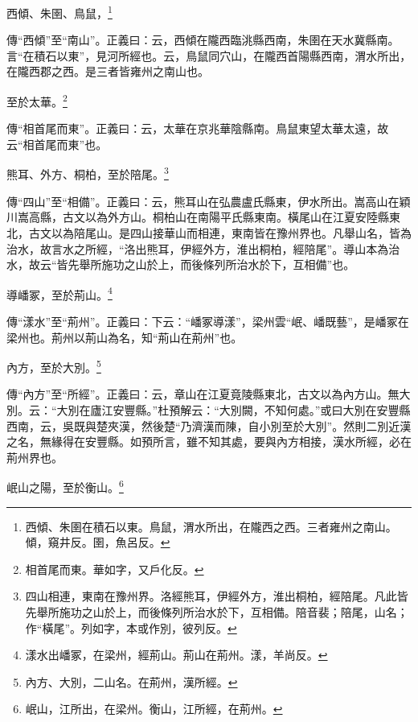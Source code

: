西傾、朱圉、鳥鼠，\footnote{西傾、朱圉在積石以東。鳥鼠，渭水所出，在隴西之西。三者雍州之南山。傾，窺井反。圉，魚呂反。}

{\noindent\zhuan{}\fzbyks 傳“西傾”至“南山”。正義曰：云，西傾在隴西臨洮縣西南，朱圉在天水冀縣南。言“在積石以東”，見河所經也。云，鳥鼠同穴山，在隴西首陽縣西南，渭水所出，在隴西郡之西。是三者皆雍州之南山也。 \par}

至於太華。\footnote{相首尾而東。華如字，又戶化反。}

{\noindent\zhuan{}\fzbyks 傳“相首尾而東”。正義曰：云，太華在京兆華陰縣南。鳥鼠東望太華太遠，故云“相首尾而東”也。 \par}

熊耳、外方、桐柏，至於陪尾。\footnote{四山相連，東南在豫州界。洛經熊耳，伊經外方，淮出桐柏，經陪尾。凡此皆先舉所施功之山於上，而後條列所治水於下，互相備。陪音裴；陪尾，山名；作“橫尾”。列如字，本或作別，彼列反。}

{\noindent\zhuan{}\fzbyks 傳“四山”至“相備”。正義曰：云，熊耳山在弘農盧氏縣東，伊水所出。嵩高山在穎川嵩高縣，古文以為外方山。桐柏山在南陽平氏縣東南。橫尾山在江夏安陸縣東北，古文以為陪尾山。是四山接華山而相連，東南皆在豫州界也。凡舉山名，皆為治水，故言水之所經，“洛出熊耳，伊經外方，淮出桐柏，經陪尾”。導山本為治水，故云“皆先舉所施功之山於上，而後條列所治水於下，互相備”也。 \par}

導嶓冢，至於荊山。\footnote{漾水出嶓冢，在梁州，經荊山。荊山在荊州。漾，羊尚反。}

{\noindent\zhuan{}\fzbyks 傳“漾水”至“荊州”。正義曰：下云：“嶓冢導漾”，梁州雲“岷、嶓既藝”，是嶓冢在梁州也。荊州以荊山為名，知“荊山在荊州”也。 \par}

內方，至於大別。\footnote{內方、大別，二山名。在荊州，漢所經。}

{\noindent\zhuan{}\fzbyks 傳“內方”至“所經”。正義曰：云，章山在江夏竟陵縣東北，古文以為內方山。無大別。云：“大別在廬江安豐縣。”杜預解云：“大別闕，不知何處。”或曰大別在安豐縣西南，云，吳既與楚夾漢，然後楚“乃濟漢而陳，自小別至於大別”。然則二別近漢之名，無緣得在安豐縣。如預所言，雖不知其處，要與內方相接，漢水所經，必在荊州界也。 \par}

岷山之陽，至於衡山。\footnote{岷山，江所出，在梁州。衡山，江所經，在荊州。}

